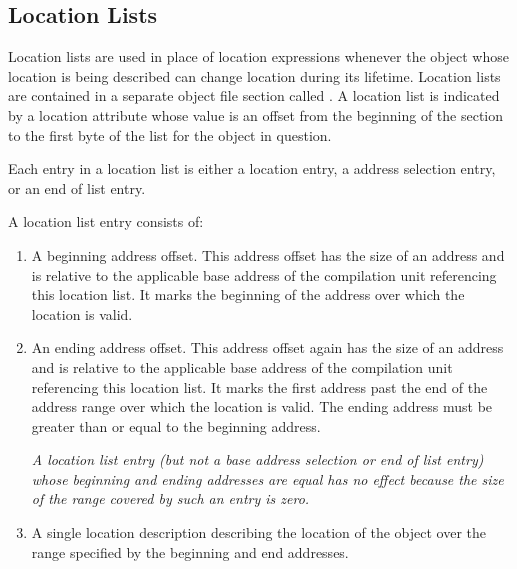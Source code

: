 \subsection{Location Lists}
\label{chap:locationlists}
Location lists 
are used in place of location expressions
whenever the object whose location is being described
can change location during its lifetime. 
Location lists
are contained in a separate object file section called
. A location list is indicated by a location
attribute whose value is an offset from the beginning of
the  section to the first byte of the list for the
object in question.

Each entry in a location list is either a location 
entry,
a 
address selection entry, 
or an 
end of list entry.

A 
location list entry consists of:

\begin{enumerate}[1]
\item A beginning address offset. 
This address offset has the size of an address and is
relative to the applicable base address of the compilation
unit referencing this location list. It marks the beginning
of the address 
over which the location is valid.

\item An ending address offset.  This address offset again
has the size of an address and is relative to the applicable
base address of the compilation unit referencing this location
list. It marks the first address past the end of the address
range over which the location is valid. The ending address
must be greater than or equal to the beginning address.

\textit{A location list entry (but not a base address selection or 
end of list entry) whose beginning
and ending addresses are equal has no effect 
because the size of the range covered by such
an entry is zero.}

\item A single location description 
describing the location of the object over the range specified by
the beginning and end addresses.
\end{enumerate}

